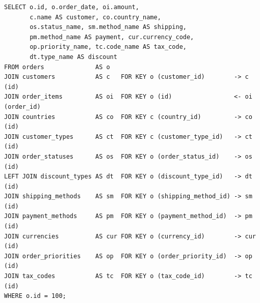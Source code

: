 \documentclass[12pt]{article}
\newcommand{\FanoutCheckHeight}[3]{%
  \ifdim\dimexpr\ht#1+\dp#1\relax>#2\relax
    \PackageError{fanout-layout}{#3 exceeds its vertical allocation}%
      {Adjust the terminal line spacing or the box position.}%
  \fi
}
\begin{document}
\newsavebox{\canonicalStageEleven}
\begin{lrbox}{\canonicalStageEleven}\begin{minipage}{344mm}
\begin{NoHyper}
\begin{lstlisting}[style=complex-sql]
SELECT o.id, o.order_date, oi.amount,
       c.name AS customer, co.country_name,
       os.status_name, sm.method_name AS shipping,
       pm.method_name AS payment, cur.currency_code,
       op.priority_name, tc.code_name AS tax_code,
       dt.type_name AS discount
FROM orders              AS o
JOIN customers           AS c   FOR KEY o (customer_id)        -> c (id)
JOIN order_items         AS oi  FOR KEY o (id)                 <- oi (order_id)
JOIN countries           AS co  FOR KEY c (country_id)         -> co (id)
JOIN customer_types      AS ct  FOR KEY c (customer_type_id)   -> ct (id)
JOIN order_statuses      AS os  FOR KEY o (order_status_id)    -> os (id)
LEFT JOIN discount_types AS dt  FOR KEY o (discount_type_id)   -> dt (id)
JOIN shipping_methods    AS sm  FOR KEY o (shipping_method_id) -> sm (id)
JOIN payment_methods     AS pm  FOR KEY o (payment_method_id)  -> pm (id)
JOIN currencies          AS cur FOR KEY o (currency_id)        -> cur (id)
JOIN order_priorities    AS op  FOR KEY o (order_priority_id)  -> op (id)
JOIN tax_codes           AS tc  FOR KEY o (tax_code_id)        -> tc (id)
WHERE o.id = 100;
\end{lstlisting}
\end{NoHyper}
\end{minipage}\end{lrbox}
\FanoutCheckHeight{\canonicalStageEleven}{122mm}{Canonical-form state 11}
\end{document}
